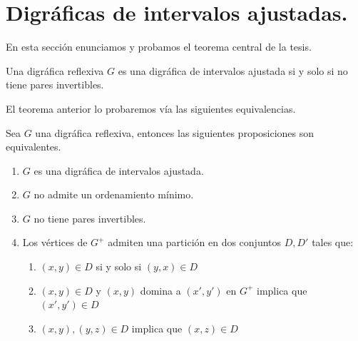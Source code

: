 \section{Digr\'aficas de intervalos ajustadas.}

En esta secci\'on enunciamos y probamos el teorema central de la tesis. 

\begin{teorema}
    Una digr\'afica reflexiva $G$ es una digr\'afica de intervalos ajustada si y solo si no tiene pares invertibles.
\end{teorema}

El teorema anterior lo probaremos vía las siguientes equivalencias.

 \begin{teorema}
     Sea $G$ una digr\'afica reflexiva, entonces las siguientes proposiciones son equivalentes.
\begin{enumerate}
  \item $G$ es una digr\'afica de intervalos ajustada.
  \item $G$ no admite un ordenamiento mínimo.
  \item $G$ no tiene pares invertibles.
  \item Los v\'ertices de $G^+$ admiten una partici\'on en dos conjuntos $D, D'$ tales que:
        \begin{enumerate}
            \item $(x,y)\in D $ si y solo si $ (y,x) \in D$
            \item $(x,y)\in D$ y $(x,y)$ domina a $(x',y')$ en $G^+$ implica que $(x',y')\in D$
            \item $(x,y), (y,z)\in D$ implica que $(x,z)\in D$
        \end{enumerate}
\end{enumerate}

\end{teorema}

